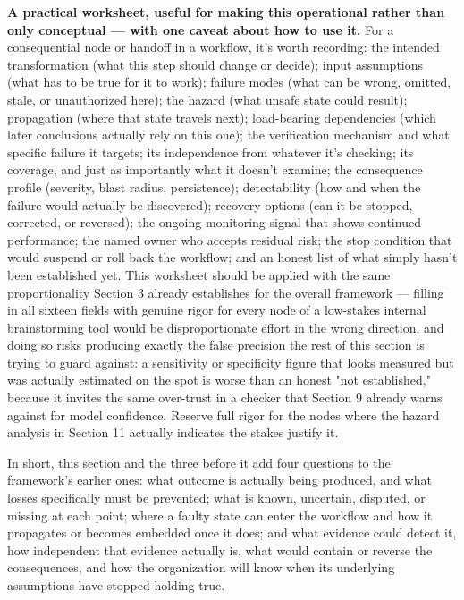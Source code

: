 \textbf{A practical worksheet, useful for making this operational rather than only conceptual --- with one caveat about how to use it.} For a consequential node or handoff in a workflow, it's worth recording: the intended transformation (what this step should change or decide); input assumptions (what has to be true for it to work); failure modes (what can be wrong, omitted, stale, or unauthorized here); the hazard (what unsafe state could result); propagation (where that state travels next); load-bearing dependencies (which later conclusions actually rely on this one); the verification mechanism and what specific failure it targets; its independence from whatever it's checking; its coverage, and just as importantly what it doesn't examine; the consequence profile (severity, blast radius, persistence); detectability (how and when the failure would actually be discovered); recovery options (can it be stopped, corrected, or reversed); the ongoing monitoring signal that shows continued performance; the named owner who accepts residual risk; the stop condition that would suspend or roll back the workflow; and an honest list of what simply hasn't been established yet. This worksheet should be applied with the same proportionality Section 3 already establishes for the overall framework --- filling in all sixteen fields with genuine rigor for every node of a low-stakes internal brainstorming tool would be disproportionate effort in the wrong direction, and doing so risks producing exactly the false precision the rest of this section is trying to guard against: a sensitivity or specificity figure that looks measured but was actually estimated on the spot is worse than an honest "not established," because it invites the same over-trust in a checker that Section 9 already warns against for model confidence. Reserve full rigor for the nodes where the hazard analysis in Section 11 actually indicates the stakes justify it.

In short, this section and the three before it add four questions to the framework's earlier ones: what outcome is actually being produced, and what losses specifically must be prevented; what is known, uncertain, disputed, or missing at each point; where a faulty state can enter the workflow and how it propagates or becomes embedded once it does; and what evidence could detect it, how independent that evidence actually is, what would contain or reverse the consequences, and how the organization will know when its underlying assumptions have stopped holding true.
